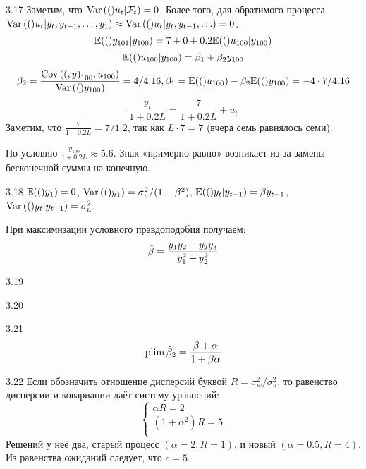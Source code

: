 \protect \hypertarget {soln:3.17}{}
\begin{solution}{{3.17}}
Заметим, что $\operatorname{Var}{\left((\right)}u_t|\mathcal{F}_t)=0$. Более того, для обратимого процесса $\operatorname{Var}{\left((\right)}u_t|y_t, y_{t-1}, \ldots, y_1) \approx \operatorname{Var}{\left((\right)}u_t|y_t, y_{t-1}, \ldots) = 0$.
\[
\mathbb{E}{\left((\right)}y_{101}|y_{100})=7 + 0 + 0.2\mathbb{E}{\left((\right)}u_{100}|y_{100})
\]
\[
\mathbb{E}{\left((\right)}u_{100}|y_{100}) = \beta_1 + \beta_2 y_{100}
\]
\[
\beta_2 = \frac{\operatorname{Cov}{\left((, y\right)}_{100}, u_{100})}{\operatorname{Var}{\left((\right)}y_{100})}=4/4.16, \beta_1 = \mathbb{E}{\left((\right)}u_{100}) - \beta_2 \mathbb{E}{\left((\right)}y_{100})=-4\cdot 7/4.16
\]
\[
\frac{y_t}{1+0.2L} = \frac{7}{1+0.2L} + u_t
\]
Заметим, что $\frac{7}{1+0.2L}=7/1.2$, так как $L\cdot 7 = 7$ (вчера семь равнялось семи).

По условию $\frac{y_{100}}{1+0.2L} \approx 5.6$. Знак «примерно равно» возникает из-за замены бесконечной суммы на конечную.

\end{solution}
\protect \hypertarget {soln:3.18}{}
\begin{solution}{{3.18}}
    $\mathbb{E}{\left((\right)}y_1)=0$, $\operatorname{Var}{\left((\right)}y_1)=\sigma^2_u/(1-\beta^2)$, $\mathbb{E}{\left((\right)}y_t|y_{t-1})=\beta y_{t-1}$, $\operatorname{Var}{\left((\right)}y_t|y_{t-1})=\sigma^2_u$.

    При максимизации условного правдоподобия получаем:
    \[
         \hat{\beta} = \frac{y_1 y_2 + y_2 y_3}{y_1^2 + y_2^2}
    \]
  
\end{solution}
\protect \hypertarget {soln:3.19}{}
\begin{solution}{{3.19}}
  
\end{solution}
\protect \hypertarget {soln:3.20}{}
\begin{solution}{{3.20}}
  
\end{solution}
\protect \hypertarget {soln:3.21}{}
\begin{solution}{{3.21}}
    \[
    \operatorname{plim} \hat \beta_2 = \frac{\beta + \alpha}{1 + \beta \alpha}
    \]
  
\end{solution}
\protect \hypertarget {soln:3.22}{}
\begin{solution}{{3.22}}
Если обозначить отношение дисперсий буквой $R = \sigma^2_w/\sigma^2_u$,
то равенство дисперсии и ковариации даёт систему уравнений:
\[
  \begin{cases}
    \alpha R = 2 \\
    (1+\alpha^2)R = 5 \\
  \end{cases}
\]
Решений у неё два, старый процесс $(\alpha=2, R=1)$, и новый $(\alpha=0.5, R=4)$.
Из равенства ожиданий следует, что $c=5$.
  
\end{solution}
